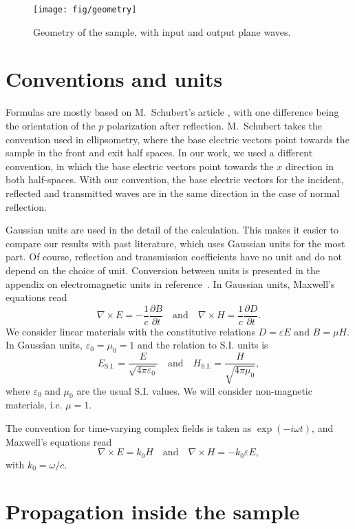 \begin{figure}
\texttt{[image: fig/geometry]}
\caption{\label{fig:geometry}Geometry of the sample, with input and output plane waves. }
\end{figure}

\section{Conventions and units}

Formulas are mostly based on M.~Schubert's article \cite{Schubert}, with one difference being the orientation of the $p$ polarization after reflection.
M.~Schubert takes the convention used in ellipsometry, where the base electric vectors point towards the sample in the front and exit half spaces.
In our work, we used a different convention, in which the base electric vectors point towards the $x$ direction in both half-spaces.
With our convention, the base electric vectors for the incident, reflected and transmitted waves are in the same direction in the case of normal reflection.

Gaussian units are used in the detail of the calculation.
This makes it easier to compare our results with past literature, which uses Gaussian units for the most part.
Of course, reflection and transmission coefficients have no unit and do not depend on the choice of unit.
Conversion between units is presented in the appendix on electromagnetic units in reference~.
In Gaussian units, Maxwell's equations read
$$
\nabla\times E = -\frac{1}{c} \frac{\partial B}{\partial t} 
\quad \mathrm{and} \quad
\nabla\times H = \frac{1}{c} \frac{\partial D}{\partial t}.
$$
We consider linear materials with the constitutive relations
$D = \varepsilon E$ and $B = \mu H$.
In Gaussian units, $\varepsilon_0=\mu_0=1$ and the relation to S.I. units is
$$
E_\mathrm{S.I.} = \frac{E}{\sqrt{4\pi\varepsilon_0}}
\quad \mathrm{and} \quad
H_\mathrm{S.I.} = \frac{H}{\sqrt{4\pi\mu_0}},
$$
where $\varepsilon_0$ and $\mu_0$ are the usual S.I. values.
We will consider non-magnetic materials, i.e. $\mu = 1$.

The convention for time-varying complex fields is taken as $\exp(-i\omega t)$, and Maxwell's equations read
$$
\nabla\times E = k_0 H
\quad \mathrm{and} \quad
\nabla\times H = -k_0 \varepsilon E,
$$
with $k_0=\omega/c$.

\section{Propagation inside the sample}

